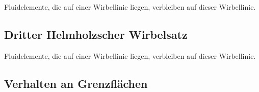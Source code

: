 \begin{displayquote}
    Fluidelemente, die auf einer Wirbellinie liegen, verbleiben auf dieser Wirbellinie.
\end{displayquote}



\subsection{Dritter Helmholzscher Wirbelsatz}

\begin{displayquote}
    Fluidelemente, die auf einer Wirbellinie liegen, verbleiben auf dieser Wirbellinie.
\end{displayquote}



\subsection{Verhalten an Grenzflächen}